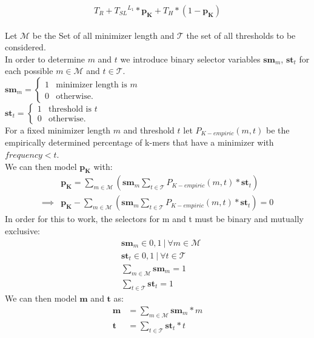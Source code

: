 \documentclass{article}
\newcommand{\timeForCheckInR}{{T_R}}
\newcommand{\timeForLookupInS}{{T_{SL}}}
\newcommand{\timeForHashtable}{{T_H}}
\newcommand{\percKmers}{\textbf{p}_\textbf{K}}
\newcommand{\percKmersEmpiric}{P_{K-empiric}}
\newcommand{\possibleMinimizerLength}{\mathcal{M}}
\newcommand{\possibleThresholds}{\mathcal{T}}
\newcommand{\minimizerLength}{\textbf{m}}
\newcommand{\threshold}{\textbf{t}}
\newcommand{\selectorm}{\textbf{sm}}
\newcommand{\selectort}{\textbf{st}}
\newcommand{\levelOne}{{L_1}}
\begin{document}
\begin{equation*}
	\timeForCheckInR + \timeForLookupInS^\levelOne * \percKmers + \timeForHashtable * (1-\percKmers)
\end{equation*}
\\
Let $\possibleMinimizerLength$ be the Set of all minimizer length and $\possibleThresholds$ the set of all thresholds to be considered.\\
In order to determine $m$ and $t$ we introduce binary selector variables $\selectorm_m$, $\selectort_t$ for each possible $m \in \possibleMinimizerLength$ and $t \in \possibleThresholds$.\\
$\selectorm_m = 
	\begin{cases}
		1 & \text{minimizer length is } m\\
		0 & \text{otherwise}.
	\end{cases}$\\
$\selectort_t = 
\begin{cases}
	1 & \text{threshold is } t\\
	0 & \text{otherwise}.
\end{cases}$\\
For a fixed minimizer length $m$ and threshold $t$ let $\percKmersEmpiric(m, t)$ be the empirically determined percentage of k-mers that have a minimizer with $frequency < t$.\\
We can then model $\percKmers$ with:
\begin{align*}
	&\percKmers = \sum_{m \in \possibleMinimizerLength} \left( \selectorm_m \sum_{t \in \possibleThresholds} \percKmersEmpiric(m, t) * \selectort_t\right)\\
	\implies &\percKmers - \sum_{m \in \possibleMinimizerLength} \left( \selectorm_m \sum_{t \in \possibleThresholds} \percKmersEmpiric(m, t) * \selectort_t\right)= 0
\end{align*}
In order for this to work, the selectors for m and t must be binary and mutually exclusive:
\begin{align*}
	&\selectorm_m \in {0,1} ~|~ \forall m \in \possibleMinimizerLength \\
	&\selectort_t \in {0,1} ~|~ \forall t \in \possibleThresholds \\
	&\sum_{m \in \possibleMinimizerLength} \selectorm_m = 1 \\
	&\sum_{t \in \possibleThresholds} \selectort_t = 1
\end{align*}
We can then model $\minimizerLength$ and $\threshold$ as:
\begin{align*}
	\minimizerLength &= \sum_{m \in \possibleMinimizerLength} \selectorm_m * m \\
	\threshold &= \sum_{t \in \possibleThresholds} \selectort_t * t
\end{align*}
\end{document}
